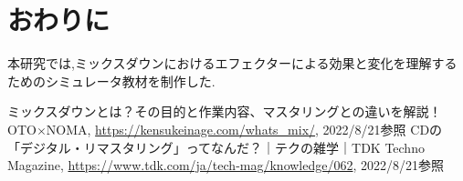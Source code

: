 \documentclass[twocolumn,10pt,a4j]{ltjsarticle}
\begin{document}
\section{おわりに}
本研究では,ミックスダウンにおけるエフェクターによる効果と変化を理解するためのシミュレータ教材を制作した.

\begin{thebibliography}{99}
 ミックスダウンとは？その目的と作業内容、マスタリングとの違いを解説！  OTO$\times$NOMA, \url{https://kensukeinage.com/whats_mix/}, 2022/8/21参照
 CDの「デジタル・リマスタリング」ってなんだ？｜テクの雑学｜TDK Techno Magazine, \url{https://www.tdk.com/ja/tech-mag/knowledge/062}, 2022/8/21参照
\end{thebibliography}
\end{document}
